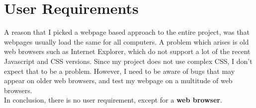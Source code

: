\newpage
\section{User Requirements}
A reason that I picked a webpage based approach to the entire project, was that webpages usually load the same for all computers. A problem which arises is old web browsers such as Internet Explorer, which do not support a lot of the recent Javascript and CSS versions. Since my project does not use complex CSS, I don't expect that to be a problem. However, I need to be aware of bugs that may appear on older web browsers, and test my webpage on a multitude of web browsers. \\
In conclusion, there is no user requirement, except for a \textbf{web browser}.
